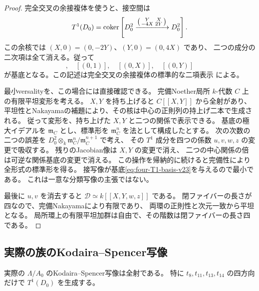 \begin{proof}
完全交叉の余接複体を使うと、接空間は
\[
 T^1(D_0)=\operatorname{coker}\left[
 D_0^2\xrightarrow{
 \left(\begin{smallmatrix}Y&X\\-4X&2Y\end{smallmatrix}\right)}D_0^2
 \right].
\]
この余核では $(X,0)=(0,-2Y)$、$(Y,0)=(0,4X)$ であり、
二つの成分の二次項は全て消える。従って
\begin{equation}
 [(1,0)],\quad[(0,1)],\quad[(0,X)],\quad[(0,Y)]
 \label{eq:four-T1-basis-v23}
\end{equation}
が基底となる。この記述は完全交叉の余接複体の標準的な二項表示
\cite[Tag 08SH]{Stacks}による。

最小versalityを、この場合には直接確認できる。
完備Noether局所 $k$-代数 $C$ 上の有限平坦変形を考える。
$X,Y$ を持ち上げると $C[[X,Y]]$ から全射があり、
平坦性とNakayamaの補題により、その核は中心の正則列の持上げ二本で生成される。
従って変形を、持ち上げた $X,Y$ と二つの関係で表示できる。
基底の極大イデアルを $\mathfrak m_C$ とし、標準形を
$\mathfrak m_C^n$ を法として構成したとする。
次の次数の二つの誤差を $D_0^2\otimes_k
\mathfrak m_C^n/\mathfrak m_C^{n+1}$ で考え、
その $T^1$ 成分を四つの係数 $u,v,w,z$ の変更で吸収する。
残りのJacobian像は $X,Y$ の変更で消え、
二つの中心関係の倍は可逆な関係基底の変更で消える。
この操作を帰納的に続けると完備性により全形式の標準形を得る。
接写像が基底\eqref{eq:four-T1-basis-v23}を与えるので最小である。
これは一意な分類写像の主張ではない。

最後に $u,v$ を消去すると
$\mathscr D\simeq k[[X,Y,w,z]]$ である。
閉ファイバーの長さが四なので、完備Nakayamaにより有限であり、
両環の正則性と次元一致から平坦となる。
局所環上の有限平坦加群は自由で、その階数は閉ファイバーの長さ四である。
\end{proof}

\subsection{実際の族のKodaira--Spencer写像}

\begin{proposition}\label{prop:actual-four-KS-v23}
実際の $\Lambda/A_0$ のKodaira--Spencer写像は全射である。
特に $t_8,t_{11},t_{13},t_{14}$ の四方向だけで $T^1(D_0)$ を生成する。
\end{proposition}

